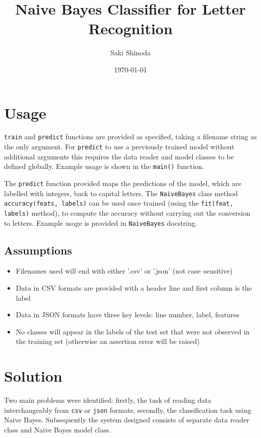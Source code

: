 \documentclass[11pt, twocolumn, a4paper]{article}
\title{Naive Bayes Classifier for Letter Recognition}
\author{Saki Shinoda}
\date{\today}
\begin{document}
\maketitle



\section{Usage}
\texttt{train} and \texttt{predict} functions are provided as specified, taking a filename string as the only argument. For \texttt{predict} to use a previously trained model without additional arguments this requires the data reader and model classes to be defined globally. Example usage is shown in the \texttt{main()} function.

The \texttt{predict} function provided maps the predictions of the model, which are labelled with integers, back to capital letters. The \texttt{NaiveBayes} class method \texttt{accuracy(feats, labels)} can be used once trained (using the \texttt{fit(feat, labels)} method), to compute the accuracy without carrying out the conversion to letters. Example usage is provided in \texttt{NaiveBayes} docstring.


\subsection{Assumptions}
\begin{itemize}
    \item Filenames used will end with either '.csv' or '.json' (not case--sensitive)
    \item Data in CSV formats are provided with a header line and first column is the label
    \item Data in JSON formats have three key levels: line number, label, features
    \item No classes will appear in the labels of the test set that were not observed in the training set (otherwise an assertion error will be raised)
\end{itemize}


\section{Solution}
Two main problems were identified: firstly, the task of reading data interchangeably from \texttt{csv} or \texttt{json} formats; secondly, the classification task using Naive Bayes.
Subsequently the system designed consists of separate data reader class and Naive Bayes model class.
\end{document}
